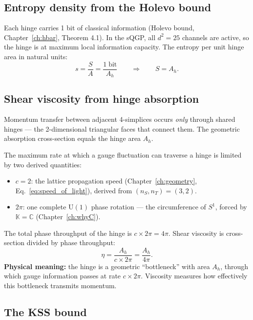 \documentclass[12pt]{article}
\theoremstyle{remark}
\theoremstyle{definition}
\begin{document}
\subsection{Entropy density from the Holevo bound}

Each hinge carries 1 bit of classical information (Holevo bound, Chapter~\ref{ch:hbar}, Theorem 4.1). In the sQGP, all $d^2 = 25$ channels are active, so the hinge is at maximum local information capacity. The entropy per unit hinge area in natural units:
\begin{equation}
s = \frac{S}{A} = \frac{1\;\text{bit}}{A_h} \qquad\Rightarrow\qquad S = A_h.
\end{equation}

\subsection{Shear viscosity from hinge absorption}

Momentum transfer between adjacent 4-simplices occurs \emph{only} through shared hinges --- the 2-dimensional triangular faces that connect them. The geometric absorption cross-section equals the hinge area $A_h$.

The maximum rate at which a gauge fluctuation can traverse a hinge is limited by two derived quantities:
\begin{itemize}
\item $c = 2$: the lattice propagation speed (Chapter~\ref{ch:geometry}, Eq.~\ref{eq:speed_of_light}), derived from $(n_S, n_T) = (3, 2)$.
\item $2\pi$: one complete $\text{U}(1)$ phase rotation --- the circumference of $S^1$, forced by $\mathbb{K} = \mathbb{C}$ (Chapter~\ref{ch:whyC}).
\end{itemize}

The total phase throughput of the hinge is $c \times 2\pi = 4\pi$. Shear viscosity is cross-section divided by phase throughput:
\begin{equation}
\eta = \frac{A_h}{c \times 2\pi} = \frac{A_h}{4\pi}.
\end{equation}
\textbf{Physical meaning:} the hinge is a geometric ``bottleneck'' with area $A_h$, through which gauge information passes at rate $c \times 2\pi$. Viscosity measures how effectively this bottleneck transmits momentum.

\subsection{The KSS bound}
\end{document}
